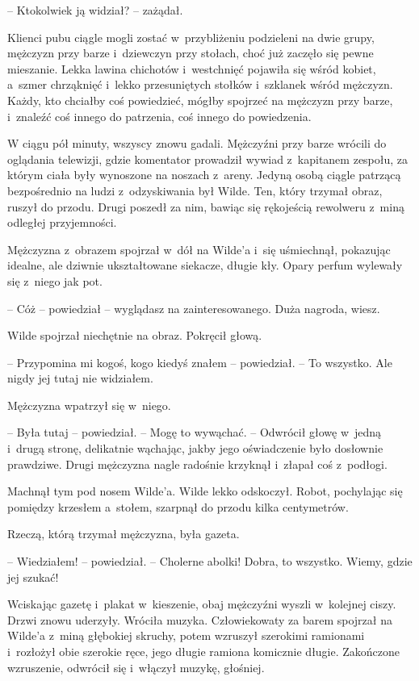 \documentclass[oneside,polish,11pt,sfheadings]{mwbk}
\begin{document}
-- Ktokolwiek ją widział? -- zażądał.

Klienci pubu ciągle mogli zostać w~przybliżeniu podzieleni na dwie
grupy, mężczyzn przy barze i~dziewczyn przy stołach, choć już zaczęło
się pewne mieszanie. Lekka lawina chichotów i~westchnięć pojawiła się
wśród kobiet, a~szmer chrząknięć i~lekko przesuniętych stołków i~szklanek wśród mężczyzn. Każdy, kto chciałby coś powiedzieć, mógłby
spojrzeć na mężczyzn przy barze, i~znaleźć coś innego do patrzenia, coś
innego do powiedzenia.

W ciągu pół minuty, wszyscy znowu gadali. Mężczyźni przy barze wrócili
do oglądania telewizji, gdzie komentator prowadził wywiad z~kapitanem
zespołu, za którym ciała były wynoszone na noszach z~areny. Jedyną osobą
ciągle patrzącą bezpośrednio na ludzi z~odzyskiwania był Wilde. Ten,
który trzymał obraz, ruszył do przodu. Drugi poszedł za nim, bawiąc się
rękojeścią rewolweru z~miną odległej przyjemności.

Mężczyzna z~obrazem spojrzał w~dół na Wilde'a i~się uśmiechnął,
pokazując idealne, ale dziwnie ukształtowane siekacze, długie kły. Opary
perfum wylewały się z~niego jak pot.

-- Cóż -- powiedział -- wyglądasz na zainteresowanego. Duża nagroda, wiesz.

Wilde spojrzał niechętnie na obraz. Pokręcił głową.

-- Przypomina mi kogoś, kogo kiedyś znałem -- powiedział. -- To wszystko.
Ale nigdy jej tutaj nie widziałem.

Mężczyzna wpatrzył się w~niego. 

-- Była tutaj -- powiedział. -- Mogę to
wywąchać. -- Odwrócił głowę w~jedną i~drugą stronę, delikatnie wąchając,
jakby jego oświadczenie było dosłownie prawdziwe. Drugi mężczyzna nagle
radośnie krzyknął i~złapał coś z~podłogi.

Machnął tym pod nosem Wilde'a. Wilde lekko odskoczył. Robot, pochylając
się pomiędzy krzesłem a~stołem, szarpnął do przodu kilka centymetrów.

Rzeczą, którą trzymał mężczyzna, była gazeta.

-- Wiedziałem! -- powiedział. -- Cholerne abolki! Dobra, to wszystko.
Wiemy, gdzie jej szukać!

Wciskając gazetę i~plakat w~kieszenie, obaj mężczyźni wyszli w~kolejnej
ciszy. Drzwi znowu uderzyły. Wróciła muzyka. Człowiekowaty za barem
spojrzał na Wilde'a z~miną głębokiej skruchy, potem wzruszył szerokimi
ramionami i~rozłożył obie szerokie ręce, jego długie ramiona komicznie
długie. Zakończone wzruszenie, odwrócił się i~włączył muzykę, głośniej.
\end{document}

